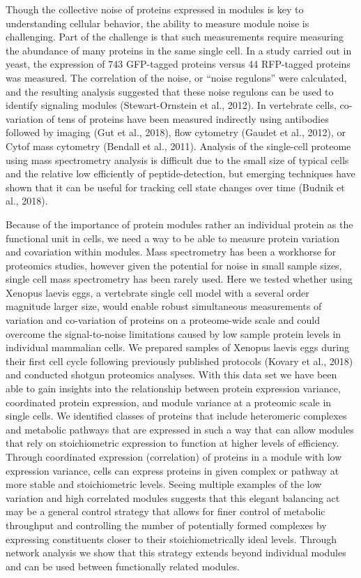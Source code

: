 Though the collective noise of proteins expressed in modules is key to understanding cellular behavior, the ability to measure module noise is challenging. Part of the challenge is that such measurements require measuring the abundance of many proteins in the same single cell. In a study carried out in yeast, the expression of 743 GFP-tagged proteins versus 44 RFP-tagged proteins was measured. The correlation of the noise, or “noise regulons” were calculated, and the resulting analysis suggested that these noise regulons can be used to identify signaling modules (Stewart-Ornstein et al., 2012). In vertebrate cells, co-variation of tens of proteins have been measured indirectly using antibodies followed by imaging (Gut et al., 2018), flow cytometry (Gaudet et al., 2012), or Cytof mass cytometry (Bendall et al., 2011). Analysis of the single-cell proteome using mass spectrometry analysis is difficult due to the small size of typical cells and the relative low efficiently of peptide-detection, but emerging techniques have shown that it can be useful for tracking cell state changes over time (Budnik et al., 2018).  

Because of the importance of protein modules rather an individual protein as the functional unit in cells, we need a way to be able to measure protein variation and covariation within modules. Mass spectrometry has been a workhorse for proteomics studies, however given the potential for noise in small sample sizes, single cell mass spectrometry has been rarely used. Here we tested whether using Xenopus laevis eggs, a vertebrate single cell model with a several order magnitude larger size, would enable robust simultaneous measurements of variation and co-variation of proteins on a proteome-wide scale and could overcome the signal-to-noise limitations caused by low sample protein levels in individual mammalian cells. We prepared samples of Xenopus laevis eggs during their first cell cycle following previously published protocols (Kovary et al., 2018) and conducted shotgun proteomics analyses. With this data set we have been able to gain insights into the relationship between protein expression variance, coordinated protein expression, and module variance at a proteomic scale in single cells. We identified classes of proteins that include heteromeric complexes and metabolic pathways that are expressed in such a way that can allow modules that rely on stoichiometric expression to function at higher levels of efficiency. Through coordinated expression (correlation) of proteins in a module with low expression variance, cells can express proteins in given complex or pathway at more stable and stoichiometric levels. Seeing multiple examples of the low variation and high correlated modules suggests that this elegant balancing act may be a general control strategy that allows for finer control of metabolic throughput and controlling the number of potentially formed complexes by expressing constituents closer to their stoichiometrically ideal levels. Through network analysis we show that this strategy extends beyond individual modules and can be used between functionally related modules.

